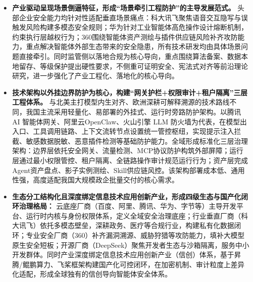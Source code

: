 \begin{itemize}[tabitem]
    \item \textbf{产业驱动呈现场景倒逼特征，形成“场景牵引工程防护”的主导发展范式。}
    头部企业安全能力均针对性适配垂直场景痛点：科大讯飞聚焦语音交互隐写与误触发风险构建多模态安全规则\cite{iflytekxingchenagent2026}；华为针对工业智能体高危操作设计熔断机制，约束执行层越权行为\cite{huaweicodearts2026}；360围绕智能体资产测绘与插件供应链风险补齐攻防能力，重点解决智能体外部生态带来的安全隐患\cite{threesixtyagentskillsreport2026}，所有技术研发均由具体场景问题直接牵引。同时监管侧以落地合规为核心导向，重点围绕算法备案、数据本地留存、等级保护提出硬性要求，不侧重可证明安全、宪法式对齐等前沿理论研究，进一步强化了产业工程化、落地化的核心导向\cite{baiduqianfanagent2026}。

    \item \textbf{技术架构以外挂边界防护为核心，构建“网关护栏+权限审计+租户隔离”三层工程体系。}
    与北美主打模型内生对齐、欧洲深耕可解释溯源的技术路线不同，我国主流采用轻量化、易部署的外挂式、运行时旁路防护架构\cite{aliyunaiguardrails2026}。以腾讯 AI 智能体网关\cite{tencentagentgateway2026}、阿里云OpenClaw\cite{aliyunopenclawdocs2026}、火山引擎 LLM 防火墙\cite{volcenginellmfirewall2026}为代表，在模型出入口、工具调用链路、上下文流转节点设置统一管控枢纽，实现提示注入拦截、敏感数据脱敏、恶意插件检测等基础防护能力。全域形成标准化三层治理架构：边界层依托安全网关、流量检测、MCP协议防护构筑外部屏障；运行层通过最小权限管控、租户隔离、全链路操作审计规范运行行为；资产层完成Agent资产盘点、影子实例测绘、Skill供应链风控。该架构部署成本低、通用性强，高度适配我国大规模政企批量交付的核心需求\cite{tencentadp2026}。

    \item \textbf{生态分工结构化且深度绑定信息技术应用创新产业，形成四级生态与国产化闭环治理格局：}
    云底座厂商（百度、阿里、腾讯、华为、字节等）主导开发平台、运行时内核与身份权限体系，定义全域安全治理底座\cite{baiduqianfanagent2026,huaweiagentidentity2026}；行业垂直厂商（科大讯飞）依托多模态壁垒，深耕政务、医疗等合规行业，构建私有化数据闭环\cite{iflyteksparkenterpriseagent2026}；专业安全厂商（360）补齐漏洞溯源、威胁狩猎等攻防能力，填补大模型原生安全短板\cite{threesixtymodelguard2026}；开源厂商（DeepSeek）聚焦开发者生态与沙箱隔离，服务中小开发群体\cite{deepseektoolcalls2026}。同时产业深度绑定信息技术应用创新产业（信创）体系，基于昇腾/鲲鹏算力、飞桨框架构建国产化可控闭环，在加密机制、审计粒度上差异化适配，形成全球独有的信创导向智能体安全体系\cite{paddlepaddle2026,huaweiagentarts2026}。
\end{itemize}

